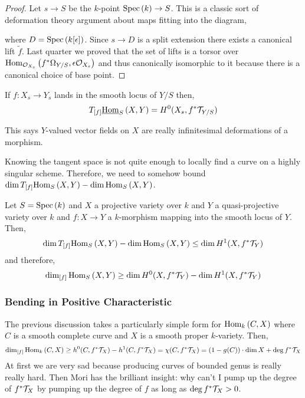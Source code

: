 \documentclass[12pt]{article}
\newcommand{\uHom}[3]{\underline{\mathrm{Hom}}_{#1}\left(#2, #3\right)}
\begin{document}
\begin{proof}
Let $s \to S$ be the $k$-point $\mathrm{Spec}\left( k \right) \to S$.
This is a classic sort of deformation theory argument about maps fitting into the diagram,
\begin{center}
\end{center}
where $D = \mathrm{Spec}\left( k[\epsilon] \right)$. Since $s \to D$ is a split extension there exists a canonical lift $\tilde{f}$. Last quarter we proved that the set of lifts is a torsor over $\mathrm{Hom}_{\mathcal{O}_{X_s}} \left( f^* \Omega_{Y/S}, \epsilon \mathcal{O}_{X_s} \right)$ and thus canonically isomorphic to it because there is a canonical choice of base point.
\end{proof}

\begin{cor}
If $f : X_s \to Y_s$ lands in the smooth locus of $Y/S$ then,
\[ T_{[f]} \uHom{S}{X}{Y} = H^0(X_s, f^* \T_{Y/S}) \]
\end{cor}

\begin{rmk}
This says $Y$-valued vector fields on $X$ are really infinitesimal deformations of a morphism.
\end{rmk}

\begin{rmk}
Knowing the tangent space is not quite enough to locally find a curve on a highly singular scheme. Therefore, we need to somehow bound $\dim T_{[f]} \mathrm{Hom}_{S} \left( X, Y \right) - \dim{\mathrm{Hom}_{S} \left( X, Y \right)}$.
\end{rmk}

\begin{prop}
Let $S = \mathrm{Spec}\left( k \right)$ and $X$ a projective variety over $k$ and $Y$ a quasi-projective variety over $k$ and $f : X \to Y$ a $k$-morphism mapping into the smooth locus of $Y$. Then,
\[ \dim T_{[f]} \mathrm{Hom}_{S} \left( X, Y \right) - \dim{\mathrm{Hom}_{S} \left( X, Y \right)} \le \dim H^1(X, f^* \mathcal{T}_Y) \]
and therefore,
\[ \dim_{[f]} \mathrm{Hom}_{S} \left( X, Y \right) \ge \dim H^0(X, f^* \mathcal{T}_Y) - \dim H^1(X, f^* \mathcal{T}_Y) \]
\end{prop}

\subsubsection{Bending in Positive Characteristic}

The previous discussion takes a particularly simple form for $\mathrm{Hom}_{k} \left( C, X \right)$ where $C$ is a smooth complete curve and $X$ is a smooth proper $k$-variety. Then,
\[ \dim_{[f]} \mathrm{Hom}_{k} \left( C, X \right) \ge h^0(C, f^* \mathcal{T}_X) - h^1(C, f^* \mathcal{T}_X) = \chi(C, f^* \mathcal{T}_X) = (1 - g(C)) \cdot \dim{X} + \deg{f^* \mathcal{T}_X} \]
At first we are very sad because producing curves of bounded genus is really really hard. Then Mori has the brilliant insight: why can't I pump up the degree of $f^* \mathcal{T}_X$ by pumping up the degree of $f$ as long as $\deg{f^* \mathcal{T}_X} > 0$.
\end{document}
